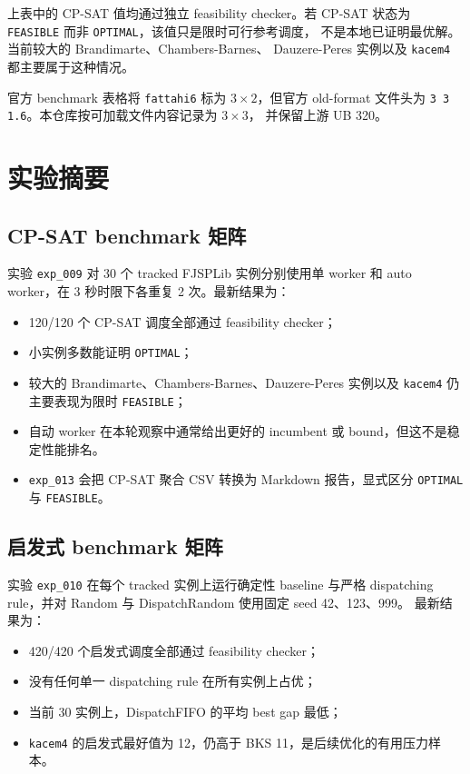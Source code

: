 ﻿\documentclass[11pt]{ctexart}
\begin{document}
上表中的 CP-SAT 值均通过独立 feasibility checker。若 CP-SAT 状态为
\texttt{FEASIBLE} 而非 \texttt{OPTIMAL}，该值只是限时可行参考调度，
不是本地已证明最优解。当前较大的 Brandimarte、Chambers-Barnes、
Dauzere-Peres 实例以及 \texttt{kacem4} 都主要属于这种情况。

官方 benchmark 表格将 \texttt{fattahi6} 标为 $3 \times 2$，但官方 old-format
文件头为 \texttt{3 3 1.6}。本仓库按可加载文件内容记录为 $3 \times 3$，
并保留上游 UB 320。

\section{实验摘要}

\subsection{CP-SAT benchmark 矩阵}

实验 \texttt{exp\_009} 对 30 个 tracked FJSPLib 实例分别使用单 worker 和
auto worker，在 3 秒时限下各重复 2 次。最新结果为：

\begin{itemize}
  \item 120/120 个 CP-SAT 调度全部通过 feasibility checker；
  \item 小实例多数能证明 \texttt{OPTIMAL}；
  \item 较大的 Brandimarte、Chambers-Barnes、Dauzere-Peres 实例以及 \texttt{kacem4} 仍主要表现为限时
  \texttt{FEASIBLE}；
  \item 自动 worker 在本轮观察中通常给出更好的 incumbent 或 bound，但这不是稳定性能排名。
  \item \texttt{exp\_013} 会把 CP-SAT 聚合 CSV 转换为 Markdown 报告，显式区分 \texttt{OPTIMAL} 与 \texttt{FEASIBLE}。
\end{itemize}

\subsection{启发式 benchmark 矩阵}

实验 \texttt{exp\_010} 在每个 tracked 实例上运行确定性 baseline 与严格
dispatching rule，并对 Random 与 DispatchRandom 使用固定 seed 42、123、999。
最新结果为：

\begin{itemize}
  \item 420/420 个启发式调度全部通过 feasibility checker；
  \item 没有任何单一 dispatching rule 在所有实例上占优；
  \item 当前 30 实例上，DispatchFIFO 的平均 best gap 最低；
  \item \texttt{kacem4} 的启发式最好值为 12，仍高于 BKS 11，是后续优化的有用压力样本。
\end{itemize}
\end{document}
